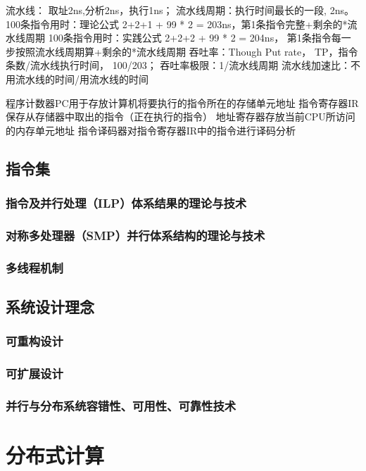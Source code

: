 \documentclass[UTF8]{../computerUniverse}
\begin{document}
流水线：
取址2ns,分析2ns，执行1ns；
流水线周期：执行时间最长的一段, 2ns。
100条指令用时：理论公式 2+2+1 + 99 * 2 = 203ns，第1条指令完整+剩余的*流水线周期
100条指令用时：实践公式 2+2+2 + 99 * 2 = 204ns， 第1条指令每一步按照流水线周期算+剩余的*流水线周期
吞吐率：Though Put rate， TP，指令条数/流水线执行时间， 100/203；
吞吐率极限：1/流水线周期
流水线加速比：不用流水线的时间/用流水线的时间


程序计数器PC用于存放计算机将要执行的指令所在的存储单元地址
指令寄存器IR保存从存储器中取出的指令（正在执行的指令）
地址寄存器存放当前CPU所访问的内存单元地址
指令译码器对指令寄存器IR中的指令进行译码分析

\section{指令集}
\subsection{指令及并行处理（ILP）体系结果的理论与技术}
\subsection{对称多处理器（SMP）并行体系结构的理论与技术}
\subsection{多线程机制}


\section{系统设计理念}

\subsection{可重构设计}
\subsection{可扩展设计}

\subsection{并行与分布系统容错性、可用性、可靠性技术}





\chapter{分布式计算}
\end{document}

